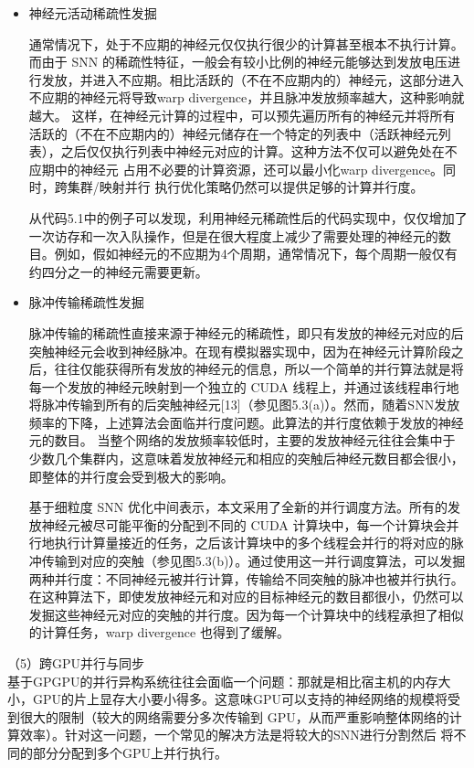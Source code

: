 \begin{itemize}
    \item 神经元活动稀疏性发掘
    
    通常情况下，处于不应期的神经元仅仅执行很少的计算甚至根本不执行计算。而由于 SNN 的稀疏性特征，一般会有较小比例的神经元能够达到发放电压进行发放，并进入不应期。相比活跃的（不在不应期内的）神经元，这部分进入不应期的神经元将导致warp divergence，并且脉冲发放频率越大，这种影响就越大。 这样，在神经元计算的过程中，可以预先遍历所有的神经元并将所有活跃的（不在不应期内的）神经元储存在一个特定的列表中（活跃神经元列表），之后仅仅执行列表中神经元对应的计算。这种方法不仅可以避免处在不应期中的神经元 占用不必要的计算资源，还可以最小化warp divergence。同时，跨集群/映射并行 执行优化策略仍然可以提供足够的计算并行度。

    从代码5.1中的例子可以发现，利用神经元稀疏性后的代码实现中，仅仅增加了一次访存和一次入队操作，但是在很大程度上减少了需要处理的神经元的数目。例如，假如神经元的不应期为4个周期，通常情况下，每个周期一般仅有约四分之一的神经元需要更新。
    
    \item 脉冲传输稀疏性发掘 

    脉冲传输的稀疏性直接来源于神经元的稀疏性，即只有发放的神经元对应的后突触神经元会收到神经脉冲。在现有模拟器实现中，因为在神经元计算阶段之后，往往仅能获得所有发放的神经元的信息，所以一个简单的并行算法就是将每一个发放的神经元映射到一个独立的 CUDA 线程上，并通过该线程串行地将脉冲传输到所有的后突触神经元[13]（参见图5.3(a)）。然而，随着SNN发放频率的下降，上述算法会面临并行度问题。此算法的并行度依赖于发放的神经元的数目。 当整个网络的发放频率较低时，主要的发放神经元往往会集中于少数几个集群内，这意味着发放神经元和相应的突触后神经元数目都会很小，即整体的并行度会受到极大的影响。
    
    基于细粒度 SNN 优化中间表示，本文采用了全新的并行调度方法。所有的发放神经元被尽可能平衡的分配到不同的 CUDA 计算块中，每一个计算块会并行地执行计算量接近的任务，之后该计算块中的多个线程会并行的将对应的脉冲传输到对应的突触（参见图5.3(b)）。通过使用这一并行调度算法，可以发掘两种并行度：不同神经元被并行计算，传输给不同突触的脉冲也被并行执行。在这种算法下，即使发放神经元和对应的目标神经元的数目都很小，仍然可以发掘这些神经元对应的突触的并行度。因为每一个计算块中的线程承担了相似的计算任务，warp divergence 也得到了缓解。

\end{itemize}

（5）跨GPU并行与同步\\

基于GPGPU的并行异构系统往往会面临一个问题：那就是相比宿主机的内存大小，GPU的片上显存大小要小得多。这意味GPU可以支持的神经网络的规模将受到很大的限制（较大的网络需要分多次传输到 GPU，从而严重影响整体网络的计算效率）。针对这一问题，一个常见的解决方法是将较大的SNN进行分割然后 将不同的部分分配到多个GPU上并行执行。

